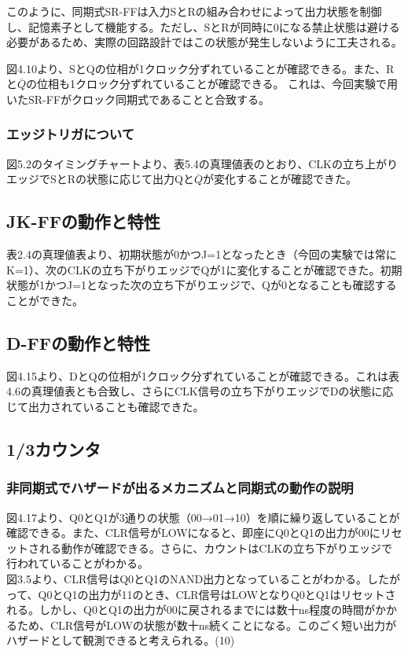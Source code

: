 \documentclass{jlreq}
\numberwithin{equation}{section}
\begin{document}
このように、同期式SR-FFは入力SとRの組み合わせによって出力状態を制御し、記憶素子として機能する。ただし、SとRが同時に0になる禁止状態は避ける必要があるため、実際の回路設計ではこの状態が発生しないように工夫される。

図4.10より、SとQの位相が1クロック分ずれていることが確認できる。また、Rと$\overline{Q}$の位相も1クロック分ずれていることが確認できる。
これは、今回実験で用いたSR-FFがクロック同期式であることと合致する。

\subsubsection{エッジトリガについて}
図5.2のタイミングチャートより、表5.4の真理値表のとおり、CLKの立ち上がりエッジでSとRの状態に応じて出力Qと$\overline{Q}$が変化することが確認できた。

\subsection{JK-FFの動作と特性}
表2.4の真理値表より、初期状態が0かつJ=1となったとき（今回の実験では常にK=1）、次のCLKの立ち下がりエッジでQが1に変化することが確認できた。初期状態が1かつJ=1となった次の立ち下がりエッジで、Qが0となることも確認することができた。

\subsection{D-FFの動作と特性}
図4.15より、DとQの位相が1クロック分ずれていることが確認できる。これは表4.6の真理値表とも合致し、さらにCLK信号の立ち下がりエッジでDの状態に応じて出力されていることも確認できた。

\subsection{1/3カウンタ}
\subsubsection{非同期式でハザードが出るメカニズムと同期式の動作の説明}
図4.17より、Q0とQ1が3通りの状態（00→01→10）を順に繰り返していることが確認できる。また、CLR信号がLOWになると、即座にQ0とQ1の出力が00にリセットされる動作が確認できる。さらに、カウントはCLKの立ち下がりエッジで行われていることがわかる。\\

図3.5より、CLR信号はQ0とQ1のNAND出力となっていることがわかる。したがって、Q0とQ1の出力が11のとき、CLR信号はLOWとなりQ0とQ1はリセットされる。しかし、Q0とQ1の出力が00に戻されるまでには数十ns程度の時間がかかるため、CLR信号がLOWの状態が数十ns続くことになる。このごく短い出力がハザードとして観測できると考えられる。(10)\\
\end{document}
